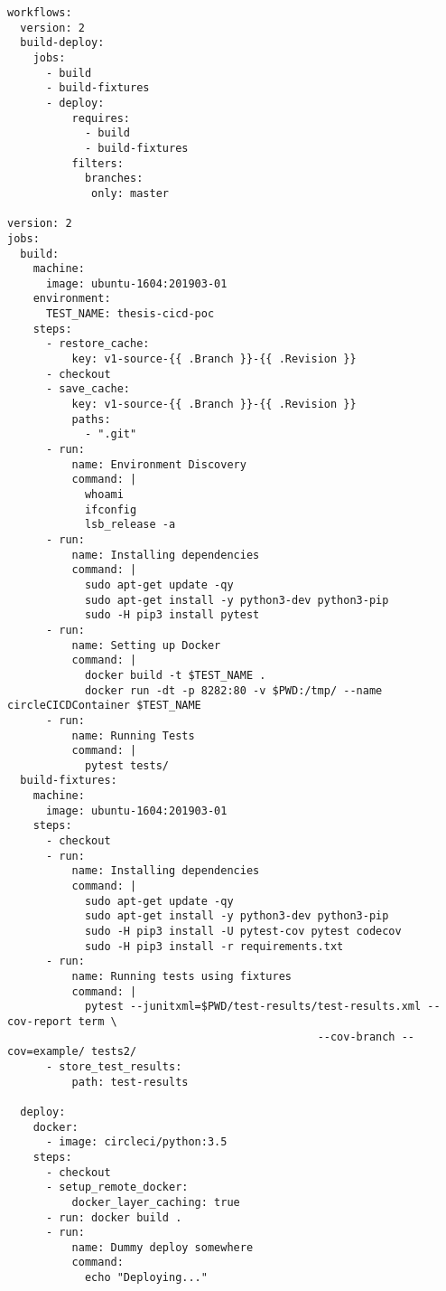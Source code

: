 \begin{lstlisting}[frame=single, basicstyle=\tiny]
workflows:
  version: 2
  build-deploy:
    jobs:
      - build
      - build-fixtures
      - deploy:
          requires:
            - build
            - build-fixtures
          filters:
            branches:
             only: master

version: 2
jobs:
  build:
    machine:
      image: ubuntu-1604:201903-01
    environment:
      TEST_NAME: thesis-cicd-poc
    steps:
      - restore_cache:
          key: v1-source-{{ .Branch }}-{{ .Revision }}
      - checkout
      - save_cache:
          key: v1-source-{{ .Branch }}-{{ .Revision }}
          paths:
            - ".git"
      - run:
          name: Environment Discovery
          command: |
            whoami
            ifconfig
            lsb_release -a
      - run:
          name: Installing dependencies
          command: |
            sudo apt-get update -qy
            sudo apt-get install -y python3-dev python3-pip
            sudo -H pip3 install pytest
      - run:
          name: Setting up Docker
          command: |
            docker build -t $TEST_NAME .
            docker run -dt -p 8282:80 -v $PWD:/tmp/ --name circleCICDContainer $TEST_NAME
      - run:
          name: Running Tests
          command: |
            pytest tests/
  build-fixtures:
    machine:
      image: ubuntu-1604:201903-01
    steps:
      - checkout
      - run:
          name: Installing dependencies
          command: |
            sudo apt-get update -qy
            sudo apt-get install -y python3-dev python3-pip
            sudo -H pip3 install -U pytest-cov pytest codecov
            sudo -H pip3 install -r requirements.txt
      - run:
          name: Running tests using fixtures
          command: |
            pytest --junitxml=$PWD/test-results/test-results.xml --cov-report term \
                                                --cov-branch --cov=example/ tests2/
      - store_test_results:
          path: test-results

  deploy:
    docker:
      - image: circleci/python:3.5
    steps:
      - checkout
      - setup_remote_docker:
          docker_layer_caching: true
      - run: docker build .
      - run:
          name: Dummy deploy somewhere
          command: 
            echo "Deploying..."
\end{lstlisting}